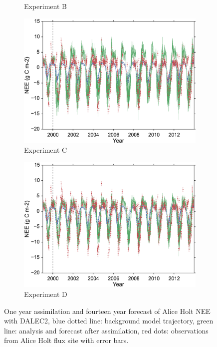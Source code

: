 \documentclass[11pt]{article}
\begin{document}
\begin{figure}
\begin{subfigure}[b]{0.49\textwidth}
        \caption{Experiment B}
        \label{fig:4dvaredcBR}
    \end{subfigure}
    \begin{subfigure}[b]{0.49\textwidth}
        \includegraphics[width=\textwidth]{C4dvar.eps}
        \caption{Experiment C}
        \label{fig:4dvarBcorR}
    \end{subfigure}
    \begin{subfigure}[b]{0.49\textwidth}
        \includegraphics[width=\textwidth]{D4dvar.eps}
        \caption{Experiment D}
        \label{fig:4dvaredcBcorR}
    \end{subfigure}
    \caption{One year assimilation and fourteen year forecast of Alice Holt NEE with DALEC2, blue dotted line: background model trajectory, green line: analysis and forecast after assimilation, red dots: observations from Alice Holt flux site with error bars.}\label{fig:4dvar}
\end{figure}
\end{document}
